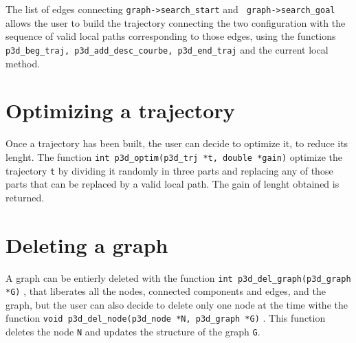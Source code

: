 The list of edges connecting {\tt graph->search\_start} and {\tt
graph->search\_goal} allows the user to build the trajectory
connecting the two configuration with the sequence of valid local
paths corresponding to those edges, using the functions {\tt
p3d\_beg\_traj, p3d\_add\_desc\_courbe, p3d\_end\_traj} and the
current local method.

\section{Optimizing a trajectory}

Once a trajectory has been built, the user can decide to optimize it,
to reduce its lenght. The function {\tt int p3d\_optim(p3d\_trj *t,
double *gain)}  optimize the trajectory {\tt t} by dividing it randomly
in three parts and replacing any of those parts that can be
replaced by a valid local path. The gain of lenght obtained is
returned.   

\section{Deleting a graph}

A graph can be entierly deleted with the function {\tt int
p3d\_del\_graph(p3d\_graph *G)} , that liberates all the nodes,
connected components and edges, and the graph, but the user can
also decide to delete only one node at the time withe the function 
{\tt void p3d\_del\_node(p3d\_node *N, p3d\_graph *G)}
. This function deletes the node {\tt N} and
updates the structure of the graph {\tt G}.
